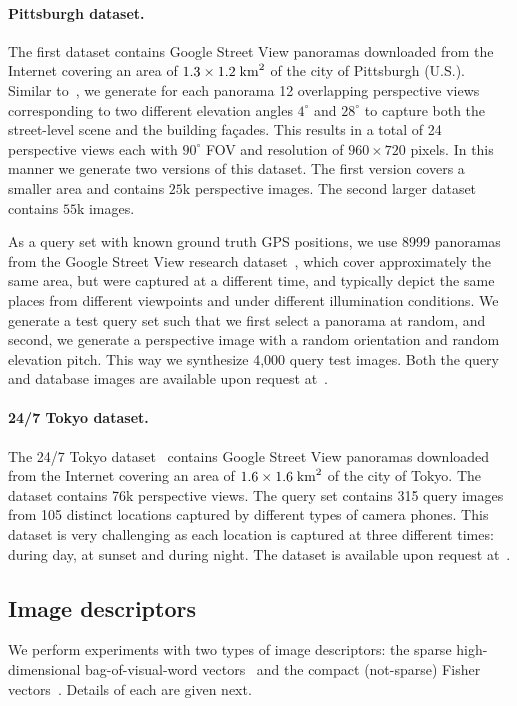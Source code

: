     \paragraph{Pittsburgh dataset.}
      {
        The first dataset contains Google Street View panoramas downloaded from the Internet covering an area of $1.3 \times 1.2 \; {\rm km}^2$ of the city of Pittsburgh (U.S.). Similar to~\cite{Chen11}, we generate for each panorama 12 overlapping perspective views corresponding to two different elevation angles $4^\circ$ and $28^\circ$ to capture both the street-level scene and the building fa\c{c}ades. This results in a total of 24 perspective views each with $90^\circ$ FOV and resolution of $960 \times 720$ pixels. In this manner we generate two versions of this dataset. The first version covers a smaller area and contains $25$k perspective images.  The second larger dataset contains $55$k images.
      }

      {
        As a query set with known ground truth GPS positions, we use 8999 panoramas from the Google Street View research dataset~\cite{GoogleResearch}, which cover approximately the same area, but were captured at a different time, and typically depict the same places from different viewpoints and under different illumination conditions.          
        We generate a test query set such that we first select a panorama at random, and second, we generate a perspective image with a random orientation and random elevation pitch. This way we synthesize 4,000 query test images. Both the query and database images are available upon request at~\cite{GronatProjectPage}.
      }

    \paragraph{24/7 Tokyo dataset.}
      {
        The 24/7 Tokyo dataset~\cite{Torii2015} contains Google Street View panoramas downloaded from the Internet covering an area of $1.6 \times 1.6 \; {\rm km}^2$ of the city of Tokyo. The dataset contains 76k perspective views. The query set contains 315 query images from 105 distinct locations captured by different types of camera phones. This dataset is very challenging as each location is captured at three different times: during day, at sunset and during night. 
        The dataset is available upon request at~\cite{Torii15project}.
      }

    \subsection{Image descriptors}
      We perform experiments with two types of image descriptors: the sparse high-dimensional bag-of-visual-word vectors~\cite{Sivic03} and the compact (not-sparse) Fisher vectors~\cite{Jegou12}. Details of each are given next.

